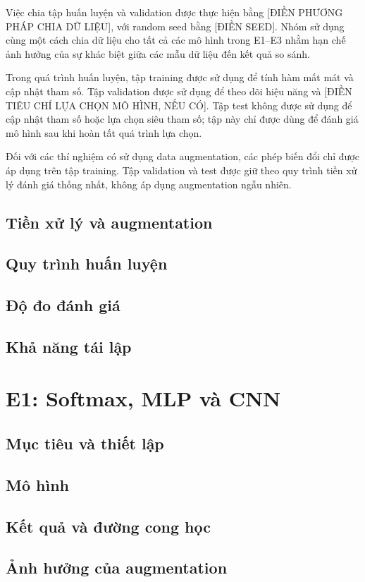 \documentclass[a4paper,12pt]{article}
\begin{document}
Việc chia tập huấn luyện và validation được thực hiện bằng
    [ĐIỀN PHƯƠNG PHÁP CHIA DỮ LIỆU], với random seed bằng
    [ĐIỀN SEED]. Nhóm sử dụng cùng một cách chia dữ liệu cho
tất cả các mô hình trong E1--E3 nhằm hạn chế ảnh hưởng của
sự khác biệt giữa các mẫu dữ liệu đến kết quả so sánh.

Trong quá trình huấn luyện, tập training được sử dụng để
tính hàm mất mát và cập nhật tham số. Tập validation được
sử dụng để theo dõi hiệu năng và [ĐIỀN TIÊU CHÍ LỰA CHỌN
    MÔ HÌNH, NẾU CÓ]. Tập test không được sử dụng để cập nhật
tham số hoặc lựa chọn siêu tham số; tập này chỉ được dùng
để đánh giá mô hình sau khi hoàn tất quá trình lựa chọn.

Đối với các thí nghiệm có sử dụng data augmentation,
các phép biến đổi chỉ được áp dụng trên tập training.
Tập validation và test được giữ theo quy trình tiền xử lý
đánh giá thống nhất, không áp dụng augmentation ngẫu nhiên.

\subsection{Tiền xử lý và augmentation}
\subsection{Quy trình huấn luyện}
\subsection{Độ đo đánh giá}
\subsection{Khả năng tái lập}

\section{E1: Softmax, MLP và CNN}
\label{sec:e1}
\subsection{Mục tiêu và thiết lập}
\subsection{Mô hình}
\subsection{Kết quả và đường cong học}
\subsection{Ảnh hưởng của augmentation}
\end{document}

